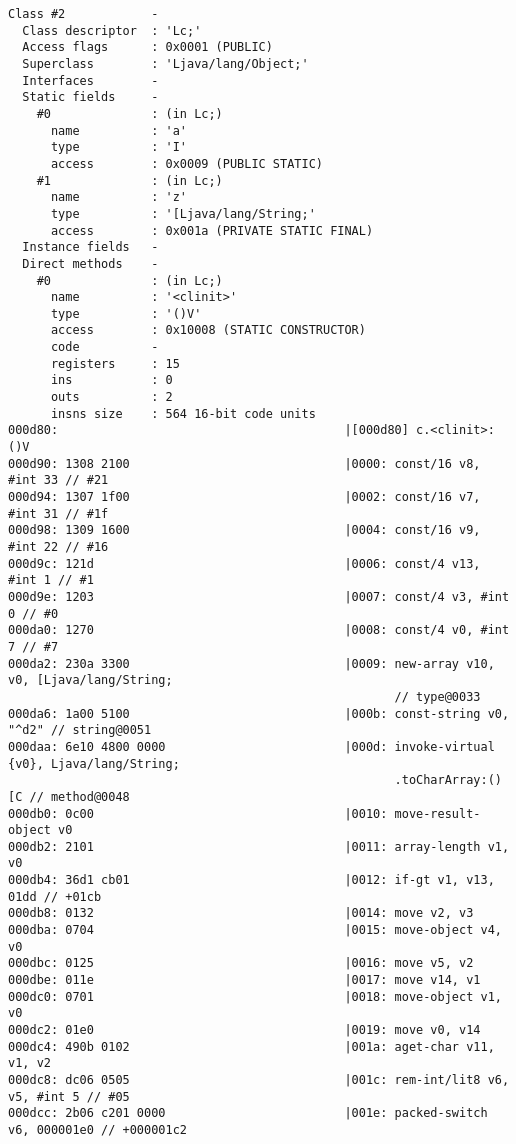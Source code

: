 \begin{lstlisting}
Class #2            -
  Class descriptor  : 'Lc;'
  Access flags      : 0x0001 (PUBLIC)
  Superclass        : 'Ljava/lang/Object;'
  Interfaces        -
  Static fields     -
    #0              : (in Lc;)
      name          : 'a'
      type          : 'I'
      access        : 0x0009 (PUBLIC STATIC)
    #1              : (in Lc;)
      name          : 'z'
      type          : '[Ljava/lang/String;'
      access        : 0x001a (PRIVATE STATIC FINAL)
  Instance fields   -
  Direct methods    -
    #0              : (in Lc;)
      name          : '<clinit>'
      type          : '()V'
      access        : 0x10008 (STATIC CONSTRUCTOR)
      code          -
      registers     : 15
      ins           : 0
      outs          : 2
      insns size    : 564 16-bit code units
000d80:                                        |[000d80] c.<clinit>:()V
000d90: 1308 2100                              |0000: const/16 v8, #int 33 // #21
000d94: 1307 1f00                              |0002: const/16 v7, #int 31 // #1f
000d98: 1309 1600                              |0004: const/16 v9, #int 22 // #16
000d9c: 121d                                   |0006: const/4 v13, #int 1 // #1
000d9e: 1203                                   |0007: const/4 v3, #int 0 // #0
000da0: 1270                                   |0008: const/4 v0, #int 7 // #7
000da2: 230a 3300                              |0009: new-array v10, v0, [Ljava/lang/String;
                                                      // type@0033
000da6: 1a00 5100                              |000b: const-string v0, "^d2" // string@0051
000daa: 6e10 4800 0000                         |000d: invoke-virtual {v0}, Ljava/lang/String;
                                                      .toCharArray:()[C // method@0048
000db0: 0c00                                   |0010: move-result-object v0
000db2: 2101                                   |0011: array-length v1, v0
000db4: 36d1 cb01                              |0012: if-gt v1, v13, 01dd // +01cb
000db8: 0132                                   |0014: move v2, v3
000dba: 0704                                   |0015: move-object v4, v0
000dbc: 0125                                   |0016: move v5, v2
000dbe: 011e                                   |0017: move v14, v1
000dc0: 0701                                   |0018: move-object v1, v0
000dc2: 01e0                                   |0019: move v0, v14
000dc4: 490b 0102                              |001a: aget-char v11, v1, v2
000dc8: dc06 0505                              |001c: rem-int/lit8 v6, v5, #int 5 // #05
000dcc: 2b06 c201 0000                         |001e: packed-switch v6, 000001e0 // +000001c2

\end{lstlisting}
